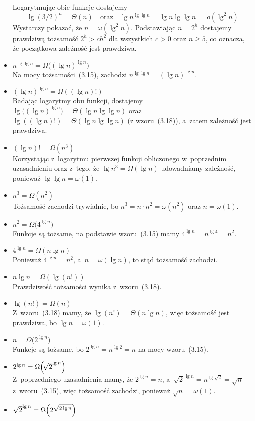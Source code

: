 \begin{itemize}
	Logarytmując obie funkcje dostajemy
	\[
		\lg(3/2)^n = \Theta(n) \quad\text{oraz}\quad \lg n^{\lg\lg n} = \lg n\lg\lg n~= o(\lg^2n)
	\]
	Wystarczy pokazać, że $n=\omega(\lg^2n)$. Podstawiając $n=2^h$ dostajemy prawdziwą tożsamość $2^h>ch^2$ dla wszystkich $c>0$ oraz $n\ge5$, co oznacza, że początkowa zależność jest prawdziwa.
\item $n^{\lg\lg n}=\Omega\bigl((\lg n)^{\lg n}\bigr)$ \\
	Na mocy tożsamości~(3.15), zachodzi $n^{\lg\lg n}=(\lg n)^{\lg n}$.
\item $(\lg n)^{\lg n}=\Omega((\lg n)!)$ \\
	Badając logarytmy obu funkcji, dostajemy $\lg\bigl((\lg n)^{\lg n}\bigr) = \Theta(\lg n\lg\lg n)$ oraz $\lg((\lg n)!)=\Theta(\lg n\lg\lg n)$ (z wzoru~(3.18)), a~zatem zależność jest prawdziwa.
\item $(\lg n)!=\Omega(n^3)$ \\
	Korzystając z~logarytmu pierwszej funkcji obliczonego w~poprzednim uzasadnieniu oraz z~tego, że $\lg n^3=\Omega(\lg n)$ udowadniamy zależność, ponieważ $\lg\lg n=\omega(1)$.
\item $n^3=\Omega(n^2)$ \\
	Tożsamość zachodzi trywialnie, bo $n^3=n\cdot n^2=\omega(n^2)$ oraz $n=\omega(1)$.
\item $n^2=\Omega\bigl(4^{\lg n}\bigr)$ \\
	Funkcje są tożsame, na podstawie wzoru~(3.15) mamy $4^{\lg n}=n^{\lg 4}=n^2$.
\item $4^{\lg n}=\Omega(n\lg n)$ \\
	Ponieważ $4^{\lg n}=n^2$, a~$n=\omega(\lg n)$, to stąd tożsamość zachodzi.
\item $n\lg n=\Omega(\lg(n!))$ \\
	Prawdziwość tożsamości wynika z~wzoru~(3.18).
\item $\lg(n!)=\Omega(n)$ \\
	Z~wzoru~(3.18) mamy, że $\lg(n!)=\Theta(n\lg n)$, więc tożsamość jest prawdziwa, bo $\lg n=\omega(1)$.
\item $n=\Omega\bigl(2^{\lg n}\bigr)$ \\
	Funkcje są tożsame, bo $2^{\lg n}=n^{\lg2}=n$ na mocy wzoru~(3.15).
\item $2^{\lg n}=\Omega\Bigl(\!\sqrt{2}^{\lg n}\Bigr)$ \\
	Z~poprzedniego uzasadnienia mamy, że $2^{\lg n}=n$, a~$\sqrt{2}^{\lg n}=n^{\lg\sqrt{2}}=\sqrt{n}$ z~wzoru~(3.15), więc tożsamość zachodzi, ponieważ $\sqrt{n}=\omega(1)$.
\item $\sqrt{2}^{\lg n}=\Omega\Bigl(2^{\sqrt{2\lg n}}\Bigr)$ \\

\end{itemize}
